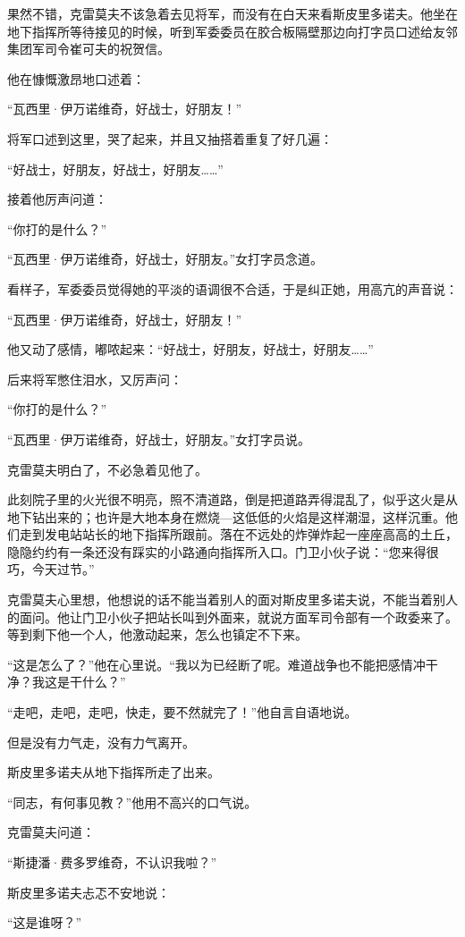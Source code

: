 果然不错，克雷莫夫不该急着去见将军，而没有在白天来看斯皮里多诺夫。他坐在地下指挥所等待接见的时候，听到军委委员在胶合板隔壁那边向打字员口述给友邻集团军司令崔可夫的祝贺信。

他在慷慨激昂地口述着：

“瓦西里·伊万诺维奇，好战士，好朋友！”

将军口述到这里，哭了起来，并且又抽搭着重复了好几遍：

“好战士，好朋友，好战士，好朋友……”

接着他厉声问道：

“你打的是什么？”

“瓦西里·伊万诺维奇，好战士，好朋友。”女打字员念道。

看样子，军委委员觉得她的平淡的语调很不合适，于是纠正她，用高亢的声音说：

“瓦西里·伊万诺维奇，好战士，好朋友！”

他又动了感情，嘟哝起来：“好战士，好朋友，好战士，好朋友……”

后来将军憋住泪水，又厉声问：

“你打的是什么？”

“瓦西里·伊万诺维奇，好战士，好朋友。”女打字员说。

克雷莫夫明白了，不必急着见他了。

此刻院子里的火光很不明亮，照不清道路，倒是把道路弄得混乱了，似乎这火是从地下钻出来的；也许是大地本身在燃烧—这低低的火焰是这样潮湿，这样沉重。他们走到发电站站长的地下指挥所跟前。落在不远处的炸弹炸起一座座高高的土丘，隐隐约约有一条还没有踩实的小路通向指挥所入口。门卫小伙子说：“您来得很巧，今天过节。”

克雷莫夫心里想，他想说的话不能当着别人的面对斯皮里多诺夫说，不能当着别人的面问。他让门卫小伙子把站长叫到外面来，就说方面军司令部有一个政委来了。等到剩下他一个人，他激动起来，怎么也镇定不下来。

“这是怎么了？”他在心里说。“我以为已经断了呢。难道战争也不能把感情冲干净？我这是干什么？”

“走吧，走吧，走吧，快走，要不然就完了！”他自言自语地说。

但是没有力气走，没有力气离开。

斯皮里多诺夫从地下指挥所走了出来。

“同志，有何事见教？”他用不高兴的口气说。

克雷莫夫问道：

“斯捷潘·费多罗维奇，不认识我啦？”

斯皮里多诺夫忐忑不安地说：

“这是谁呀？”

